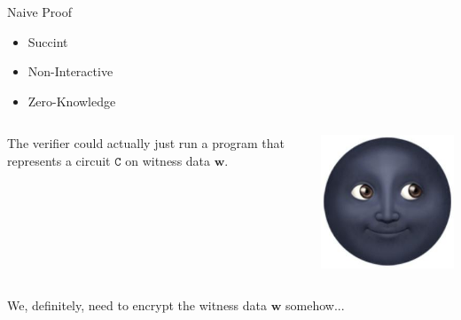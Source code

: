 \documentclass{zkdl-presentation-template}
\begin{document}
    \begin{frame}{Naive Proof}
        \begin{itemize}
            \item[\ding{55}] Succint
            \item[\ding{51}] Non-Interactive
            \item[\ding{55}] Zero-Knowledge
        \end{itemize}

        
        \vspace{20pt}
        \begin{columns}
            \begin{column}{0.7\textwidth}
                The verifier could actually just run a program that represents a circuit 
                $\mathtt{C}$ on witness data $\boldsymbol{w}$.
            \end{column}

            \begin{column}{0.2\textwidth}
                \includegraphics[width=\linewidth]{../presentations/images/common/new-moon-with-face.jpg}
            \end{column}
        \end{columns}

        We, definitely, need to encrypt the witness data $\boldsymbol{w}$ somehow...
    \end{frame}
\end{document}
